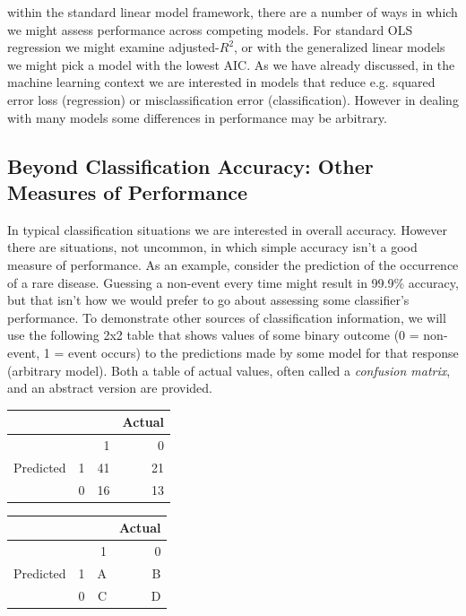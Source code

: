 \documentclass[english,nohyper,titlepage]{tufte-handout}\usepackage{knitr}
\begin{document}
 within the standard linear model framework, there are a number of ways in which we might assess performance across competing models.  For standard OLS regression we might examine adjusted-$R^2$, or with the generalized linear models we might pick a model with the lowest AIC.  As we have already discussed, in the machine learning context we are interested in models that reduce e.g. squared error loss (regression) or misclassification error (classification).  However in dealing with many models some differences in performance may be arbitrary.

\subsection{Beyond Classification Accuracy: Other Measures of Performance}
In typical classification situations we are interested in overall accuracy.  However there are situations, not uncommon, in which simple accuracy isn't a good measure of performance.  As an example, consider the prediction of the occurrence of a rare disease. Guessing a non-event every time might result in 99.9\% accuracy, but that isn't how we would prefer to go about assessing some classifier's performance.
To demonstrate other sources of classification information, we will use the following 2x2 table that shows values of some binary outcome (0 = non-event, 1 = event occurs) to the predictions made by some model for that response (arbitrary model).  Both a table of actual values, often called a \emph{confusion matrix}, and an abstract version are provided.


\begin{table}[ht]
\begin{minipage}[b]{0.45\linewidth}
    \begin{tabular}{llrr}
     & & & Actual \\
     \hline
     & & 1 & 0\\ 
     \hline
     Predicted & 1 &  41 &  21 \\ 
     & 0 &  16 &  13\\ 
     \hline
    \end{tabular}
\end{minipage}
\hspace{0.5cm}
\begin{minipage}[b]{0.45\linewidth}
    \begin{tabular}{lrrr}
     & & & Actual \\
     \hline
     & & 1 & 0\\ 
     \hline
     Predicted & 1 &  A &  B \\ 
     & 0 &  C &  D\\ 
     \hline
    \end{tabular}
\end{minipage}
\end{table}
\end{document}
